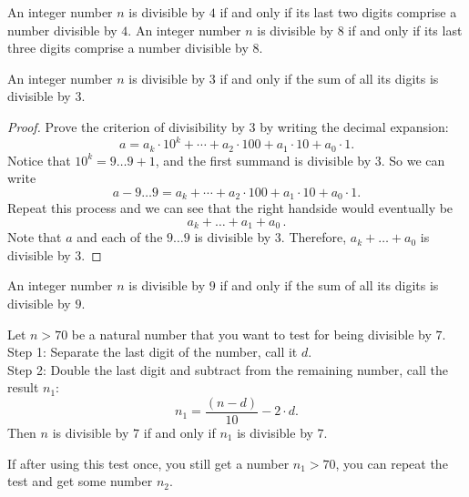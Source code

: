 \begin{proposition}
An integer number $n$ is divisible by $4$ if and only if its last two digits comprise a number divisible by $4$. An integer number $n$ is divisible by $8$ if and only if its last three digits comprise a number divisible by $8$. 
\end{proposition}

\begin{proposition}
An integer number $n$ is divisible by $3$ if and only if the sum of all its digits is divisible by $3$.
\end{proposition}

\begin{proof}
Prove the criterion of divisibility by 3 by writing the decimal expansion:
$$ a = a_k \cdot 10^k + \cdots + a_2 \cdot 100 + a_1 \cdot 10 + a_0 \cdot 1
.$$
Notice that $10^k = 9\dots9 + 1$, and the first summand is divisible by 3. So we can write
$$ a - 9\dots9 = a_k + \cdots + a_2 \cdot 100 + a_1 \cdot 10 + a_0 \cdot 1
.$$
Repeat this process and we can see that the right handside would eventually be 
\begin{equation*}
    a_k + \dots + a_1 + a_0 \,.
\end{equation*}
Note that
$a$ and each of the $9\dots 9$ is divisible by 3. Therefore, $a_k + \dots + a_0$ is divisible by 3.
\end{proof}

\begin{proposition}
An integer number $n$ is divisible by $9$ if and only if the sum of all its digits is divisible by $9$.
\end{proposition}

\begin{theorem}
    Let $n>70$ be a natural number that you want to test for being divisible by $7$.
    \\Step 1: Separate the last digit of the number, call it $d$.
    \\Step 2: Double the last digit and subtract from the remaining number, call the result $n_1$:
    $$ n_1 = \frac{(n - d)}{10} - 2 \cdot d
    .$$
    Then $n$ is divisible by $7$ if and only if $n_1$ is divisible by $7$. 
\end{theorem}
If after using this test once, you still get a number $n_1 > 70$, you can repeat the test and get some number $n_2$.

